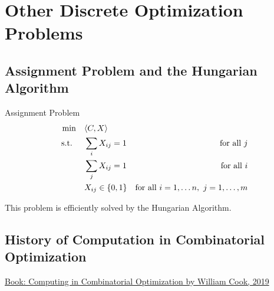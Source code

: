 
\section{Other Discrete Optimization Problems}
\subsection{Assignment Problem and the Hungarian Algorithm}
\begin{general}{Assignment Problem}{\polynomial}
\begin{align*}
\min \quad & \langle C, X\rangle\\
\mbox{ s.t. } \quad  & \sum_{i} X_{ij} = 1 & \mbox{for all } j\\
& \sum_j X_{ij} = 1 & \mbox{for all } i\\
& X_{ij} \in \{0,1\} & \mbox{for all } i=1, \dots n,\  j=1, \dots, m
\end{align*}
\end{general}

This problem is efficiently solved by the Hungarian Algorithm.

\subsection{History of Computation in Combinatorial Optimization}

\href{https://link.springer.com/chapter/10.1007/978-3-319-91908-9_3}{Book: Computing in Combinatorial Optimization by William Cook, 2019}